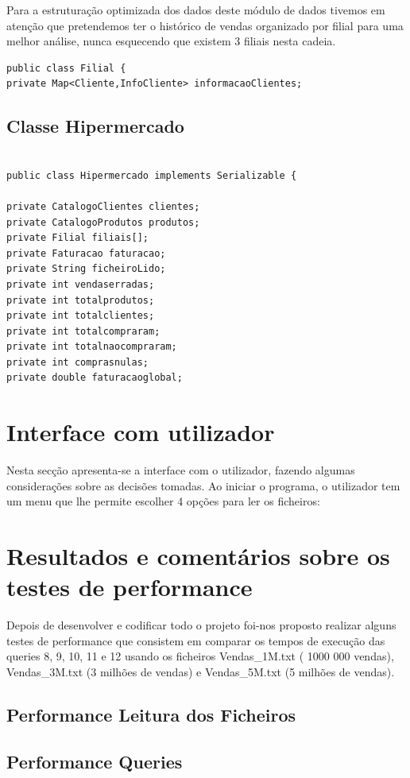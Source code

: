  Para a estruturação optimizada dos dados deste módulo de dados tivemos em atenção que pretendemos ter o histórico de vendas organizado por filial para uma melhor análise, nunca esquecendo que existem 3 filiais nesta cadeia. 


\begin{verbatim}
public class Filial {
private Map<Cliente,InfoCliente> informacaoClientes; 
\end{verbatim}

\section{Classe Hipermercado }

\begin{verbatim}

public class Hipermercado implements Serializable {

private CatalogoClientes clientes;
private CatalogoProdutos produtos;
private Filial filiais[];
private Faturacao faturacao;
private String ficheiroLido;
private int vendaserradas;
private int totalprodutos;
private int totalclientes;
private int totalcompraram;
private int totalnaocompraram;
private int comprasnulas;
private double faturacaoglobal;
\end{verbatim}


\chapter{Interface com utilizador}

Nesta secção apresenta-se a interface com o utilizador, fazendo algumas considerações sobre as decisões tomadas.
Ao iniciar o programa, o utilizador tem um menu que lhe permite escolher 4 opções para ler os ficheiros:




\chapter{Resultados e comentários sobre os testes de performance}

Depois de desenvolver e codificar todo o projeto foi-nos proposto realizar alguns testes de performance que consistem em comparar os tempos de execução das queries 8, 9, 10, 11 e 12 usando os ficheiros Vendas\_1M.txt ( 1000 000 vendas), Vendas\_3M.txt (3 milhões de vendas) e Vendas\_5M.txt (5 milhões de vendas).


\section{Performance Leitura dos Ficheiros}

\section{Performance Queries }


  	